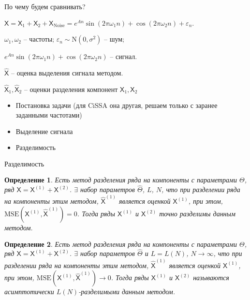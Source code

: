 \documentclass[notheorems, handout]{beamer}
\newtheorem{definition}{Определение}
\newcommand{\TS}{\mathsf{X}}
\begin{document}
	\begin{frame}{По чему будем сравнивать?}

		\textbf{} 
		$\TS = \TS_{1} + \TS_{2} + \TS_{\mathrm{Noise}}=e^{A{n}}
		\sin\left({2\pi\omega_1 n}\right) + 
		\cos\left({2\pi\omega_2 n}\right) + \varepsilon_n$.

		$\omega_1, \omega_2$ -- частоты;
		$\varepsilon_n \sim \mathrm N(0, \sigma^2)$ -- шум; 

		$e^{A{n}}
		\sin\left({2\pi\omega_1 n}\right) + 
		\cos\left({2\pi\omega_2 n}\right)$ -- сигнал.

		$\hat{\TS}$ -- оценка выделения сигнала методом.

		$\hat{\TS}_{1}, 
		\hat{\TS}_{2}$ -- оценки разделения компонент $\TS_1, \TS_2$

		\bigskip

		\textbf{}
		\begin{itemize}
			\item Постановка задачи (для CiSSA она другая, решаем только с заранее заданными частотами)
			\item Выделение сигнала
			\item Разделимость
		\end{itemize}
		
	\end{frame}


	\begin{frame}{Разделимость}
		\begin{definition}
			\label{def:exact}
			Есть метод разделения ряда на компоненты с параметрами \( \Theta \), ряд \( \TS = \TS^{(1)} + \TS^{(2)} \). $\exists$ набор параметров \( \hat{\Theta} \), \( L \), \( N\), что при разделении ряда на компоненты этим методом, \( \hat{\TS}^{(1)} \) является оценкой \( \TS^{(1)} \), при этом, \( \mathrm{MSE}\left(\TS^{(1)}, \hat{\TS}^{(1)}\right) = 0 \). Тогда ряды \( \TS^{(1)} \) и \( \TS^{(2)} \) точно разделимы данным методом.
		\end{definition}
		\begin{definition}
			\label{def:asymp}
			Есть метод разделения ряда на компоненты с параметрами \( \Theta \), ряд \( \TS = \TS^{(1)} + \TS^{(2)} \). $\exists$ набор параметров \( \hat{\Theta} \) и \( L = L(N) \), \( N \rightarrow \infty \), что при разделении ряда на компоненты этим методом, \( \hat{\TS}^{(1)} \) является оценкой \( \TS^{(1)} \), при этом, \( \mathrm{MSE}\left(\TS^{(1)}, \hat{\TS}^{(1)}\right) \rightarrow 0 \). Тогда ряды \( \TS^{(1)} \) и \( \TS^{(2)} \) называются асимптотически \( L(N) \)-разделимыми данным методом.
		\end{definition}

	\end{frame}
	
\end{document}
